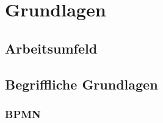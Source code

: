 \section{Grundlagen}
\subsection{Arbeitsumfeld}
\label{Abschnitt:Arbeitsumfeld}
\subsection{Begriffliche Grundlagen}
\subsubsection{BPMN}

 
